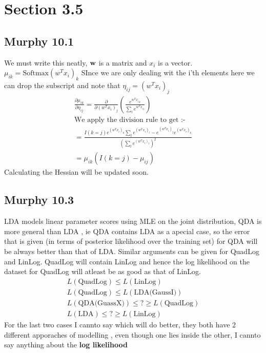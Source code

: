 \section{Section 3.5}

\subsection{Murphy 10.1}
We must write this neatly, $\vb{w}$ is a matrix and $x_i $ is a vector.
$\mu_{ik} = \text{Softmax}(w^T x_i)_k$ SInce we are only dealing wit the i'th elements here
we can drop the subscript and note that $\eta_{ij} = (w^Tx_i)_j$
\begin{align}
    \frac{\partial \mu_{ik}}{\partial \eta_{ij} } = \frac{\partial}{\partial (w^Tx_i)_j } (\frac{e^{{w^Tx_i}_k}}{\sum_l e^{{w^Tx_i}_l}}) \\
    \text{We apply the division rule to get :-} \\
    = \frac{I(k = j)e^{(w^Tx_i)_k}\sum_l e^{(w^Tx_i)_l} - e^{(w^Tx_i)_j}e^{(w^Tx_i)_k}}{(\sum_l e^{(w^Tx_i)_l})^2} \\ 
    = \mu_{ik} (I( k = j) - \mu_{ij})
\end{align}
Calculating the Hessian will be updated soon.


\subsection{Murphy 10.3}
LDA models linear parameter scores using MLE on the joint distribution, QDA is more general than
LDA , ie QDA contains LDA as a apecial case, so the error that is given (in terms of posterior likelihood over the training set)
for QDA will be always better than that of LDA. Similar arguments can be given for QuadLog and LinLog. QuadLog will contain LinLog and
hence the log likelihood on the dataset for QuadLog will atleast be as good as that of LinLog.
\begin{gather}
    L(\text{QuadLog}) \le L(\text{LinLog}) \\
    L(\text{QuadLog}) \le L(\text{LDA(GaussI)}) \\
    L(\text{QDA(GuassX)}) \le  ? \ge L(\text{QuadLog}) \\
    L(\text{LDA}) \le ? \ge L(\text{LinLog})
\end{gather}
For the last two cases I cannto say which will do better, they both have 2 different apporaches of modelling 
, even though one lies inside the other, I cannto say anything about the \textbf{log likelihood}